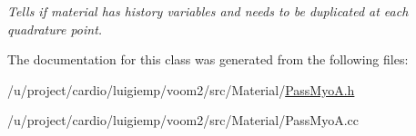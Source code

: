 \begin{DoxyCompactItemize}
\begin{DoxyCompactList}\small\item\em Tells if material has history variables and needs to be duplicated at each quadrature point. \item\end{DoxyCompactList}\end{DoxyCompactItemize}


The documentation for this class was generated from the following files:\begin{DoxyCompactItemize}
\item 
/u/project/cardio/luigiemp/voom2/src/Material/\hyperlink{_pass_myo_a_8h}{PassMyoA.h}\item 
/u/project/cardio/luigiemp/voom2/src/Material/PassMyoA.cc\end{DoxyCompactItemize}
